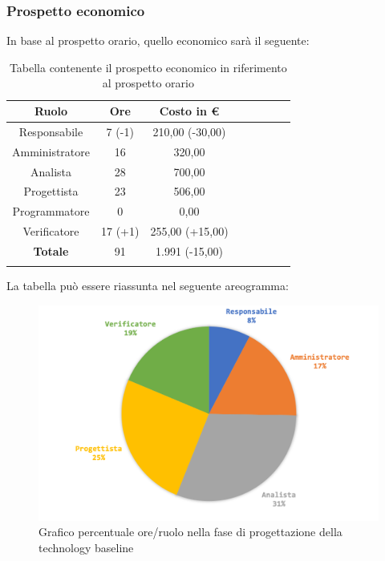		\subsubsection{Prospetto economico}
			In base al prospetto orario, quello economico sarà il seguente: 
			
			\begin{longtable}{|c|c|c|c|c|c|c|c}
				\hline
				\rowcolor{lighter-grayer}
				\textbf{Ruolo} & \textbf{Ore} & \textbf{Costo in €} \\
				\hline
				\endfirsthead
				\hline
			Responsabile 	    & 7 (-1) & 210,00 (-30,00)\\
			\hline 
			\hline
			Amministratore	  & 16 & 320,00\\
			\hline
			\hline
			Analista 				& 28 & 700,00\\
			\hline
			\hline
			Progettista 		  & 23 & 506,00\\
			\hline
			\hline
			Programmatore 	 & 0 & 0,00\\
			\hline
			\hline
			Verificatore 		  & 17 (+1) & 255,00 (+15,00)\\
			\hline
			\textbf{Totale} 	& 91 & 1.991 (-15,00)\\
			\hline
				
				\caption{Tabella contenente il prospetto economico in riferimento al prospetto orario}
			\end{longtable}
			
			La tabella può essere riassunta nel seguente areogramma:
			\begin{figure}[H]
				\centering
				\includegraphics[width=0.8\linewidth]{images/consuntivo/ConsCorrez2.png}
				\caption{Grafico percentuale ore/ruolo nella fase di progettazione della technology baseline}
				\label{fig:consuntivo grafico costi ruolo fase progettazione della technology baseline}
			\end{figure}
		
